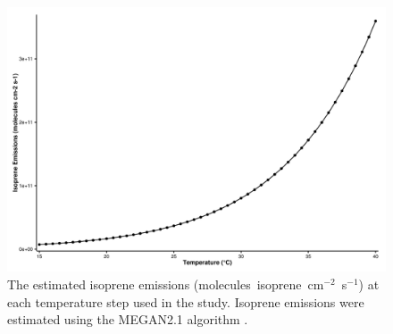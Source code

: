 \begin{figure}%
    \centering%
    \caption{The estimated isoprene emissions (molecules~isoprene~cm$^{-2}$~s$^{-1}$) at each temperature step used in the study. Isoprene emissions were estimated using the MEGAN2.1 algorithm \citep{Guenther:2012}.}
    \label{f:isoprene_emissions}%
    \includegraphics[width=\textwidth]{img/isoprene_emissions}
\end{figure}

